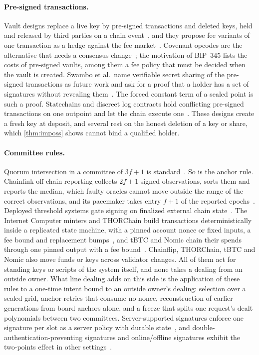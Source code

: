 \paragraph{Pre-signed transactions.} Vault designs replace a live key by pre-signed transactions and deleted keys, held and released by third parties on a chain event~\cite{SHMB20a,SHMB20b,SP21}, and they propose fee variants of one transaction as a hedge against the fee market~\cite{SHMB20a,SHMB20b,Todd23}. Covenant opcodes are the alternative that needs a consensus change~\cite{MES16,BIP345}; the motivation of BIP~345 lists the costs of pre-signed vaults, among them a fee policy that must be decided when the vault is created. Swambo et al.\ name verifiable secret sharing of the pre-signed transactions as future work and ask for a proof that a holder has a set of signatures without revealing them~\cite{SHMB20a}. The forced constant term of a sealed point is such a proof. Statechains and discreet log contracts hold conflicting pre-signed transactions on one outpoint and let the chain execute one~\cite{Mercury,Dryja}. These designs create a fresh key at deposit, and several rest on the honest deletion of a key or share, which \cref{thm:imposs} shows cannot bind a qualified holder.

\paragraph{Committee rules.} Quorum intersection in a committee of $3f+1$ is standard~\cite{Brick}. So is the anchor rule. Chainlink off-chain reporting collects $2f+1$ signed observations, sorts them and reports the median, which faulty oracles cannot move outside the range of the correct observations, and its pacemaker takes entry $f+1$ of the reported epochs~\cite{OCR21}. Deployed threshold systems gate signing on finalized external chain state~\cite{Chainflip,THORChain,TACo}. The Internet Computer minters and THORChain build transactions deterministically inside a replicated state machine, with a pinned account nonce or fixed inputs, a fee bound and replacement bumps~\cite{ckETH,ckBTC,THORChain}, and tBTC and Nomic chain their spends through one pinned output with a fee bound~\cite{tBTC,Nomic}. Chainflip, THORChain, tBTC and Nomic also move funds or keys across validator changes. All of them act for standing keys or scripts of the system itself, and none takes a dealing from an outside owner. What line dealing adds on this side is the application of these rules to a one-time intent bound to an outside owner's dealing: selection over a sealed grid, anchor retries that consume no nonce, reconstruction of earlier generations from board anchors alone, and a freeze that splits one request's dealt polynomials between two committees. Server-supported signatures enforce one signature per slot as a server policy with durable state~\cite{ATS96,DMT02}, and double-authentication-preventing signatures and online/offline signatures exhibit the two-points effect in other settings~\cite{PS17,ST01}.

